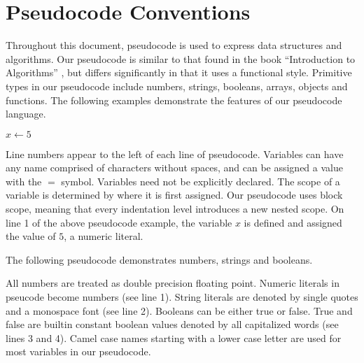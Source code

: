 %

\section{Pseudocode Conventions}
Throughout this document, pseudocode is used to express data structures and algorithms. Our pseudocode is similar to that found in the book ``Introduction to Algorithms'' \cite{cormen2009introduction}, but differs significantly in that it uses a functional style. Primitive types in our pseudocode include numbers, strings, booleans, arrays, objects and functions. The following examples demonstrate the features of our pseudocode language.

\begin{codebox}
\li $x \gets 5$
\end{codebox}

Line numbers appear to the left of each line of pseudocode. Variables can have any name comprised of characters without spaces, and can be assigned a value with the $=$ symbol. Variables need not be explicitly declared. The scope of a variable is determined by where it is first assigned. Our pseudocode uses block scope, meaning that every indentation level introduces a new nested scope. On line 1 of the above pseudocode example, the variable $x$ is defined and assigned the value of $5$, a numeric literal.

The following pseudocode demonstrates numbers, strings and booleans.


All numbers are treated as double precision floating point. Numeric literals in pseucode become numbers (see line 1). String literals are denoted by single quotes and a monospace font (see line 2). Booleans can be either true or false. True and false are builtin constant boolean values denoted by all capitalized words (see lines 3 and 4). Camel case names starting with a lower case letter are used for most variables in our pseudocode.

